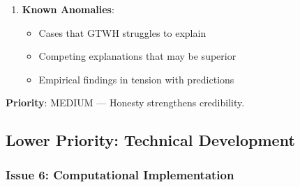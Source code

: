 \begin{tcolorbox}[colback=yellow!5!white, colframe=yellow!75!black, title=Status: Not Addressed]
\begin{enumerate}
\item \textbf{Known Anomalies}:
    \begin{itemize}[nosep]
    \item Cases that GTWH struggles to explain
    \item Competing explanations that may be superior
    \item Empirical findings in tension with predictions
    \end{itemize}
\end{enumerate}

\textbf{Priority}: \colorbox{yellow!20}{MEDIUM} --- Honesty strengthens credibility.
\end{tcolorbox}

\subsection{Lower Priority: Technical Development}

\subsubsection{Issue 6: Computational Implementation}

